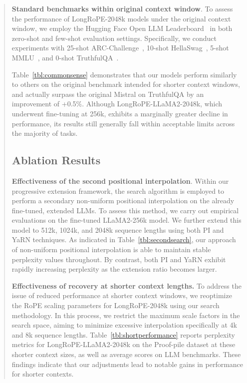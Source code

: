 \begin{abstract}
\textbf{Standard benchmarks within original context window}. To assess the performance of LongRoPE-2048k models under the original context window, we employ the Hugging Face Open LLM Leaderboard~\cite{huggingfaceboard} in both zero-shot and few-shot evaluation settings. Specifically, we conduct experiments with 25-shot ARC-Challenge~\cite{allenai:arc}, 10-shot HellaSwag~\cite{zellers2019hellaswag}, 5-shot MMLU~\cite{mmlu}, and 0-shot TruthfulQA~\cite{lin2021truthfulqa}.

Table~\ref{tbl:commonsense} demonstrates that our models perform similarly to others on the original benchmark intended for shorter context windows, and actually surpass the original Mistral on TruthfulQA by an improvement of +0.5\%. Although LongRoPE-LLaMA2-2048k, which underwent fine-tuning at 256k, exhibits a marginally greater decline in performance, its results still generally fall within acceptable limits across the majority of tasks.

\subsection{Ablation Results}

\textbf{Effectiveness of the second positional interpolation}. Within our progressive extension framework, the search algorithm is employed to perform a secondary non-uniform positional interpolation on the already fine-tuned, extended LLMs. To assess this method, we carry out empirical evaluations on the fine-tuned LLaMA2-256k model. We further extend this model to 512k, 1024k, and 2048k sequence lengths using both PI and YaRN techniques. As indicated in Table~\ref{tbl:secondsearch}, our approach of non-uniform positional interpolation is able to maintain stable perplexity values throughout. By contrast, both PI and YaRN exhibit rapidly increasing perplexity as the extension ratio becomes larger.

\textbf{Effectiveness of recovery at shorter context lengths.} To address the issue of reduced performance at shorter context windows, we reoptimize the RoPE scaling parameters for LongRoPE-2048k using our search methodology. In this process, we restrict the maximum scale factors in the search space, aiming to minimize excessive interpolation specifically at 4k and 8k sequence lengths. Table~\ref{tbl:shortperformance} reports perplexity metrics for LongRoPE-LLaMA2-2048k on the Proof-pile dataset at these shorter context sizes, as well as average scores on LLM benchmarks. These findings indicate that our adjustments lead to notable gains in performance for shorter contexts.


\end{abstract}

